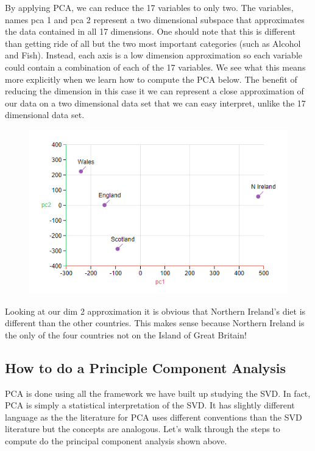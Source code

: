 \documentclass{article}
\begin{document}
\bigskip
By applying PCA, we can reduce the 17 variables to only two. The variables, names pca 1 and pca 2 represent a two dimensional subspace that approximates the data contained in all 17 dimensions. One should note that this is different than getting ride of all but the two most important categories (such as Alcohol and Fish). Instead, each axis is a low dimension approximation so each variable could contain a combination of each of the 17 variables. We see what this means more explicitly when we learn how to compute the PCA below. The benefit of reducing the dimension in this case it we can represent a close approximation of our data on a two dimensional data set that we can easy interpret, unlike the 17 dimensional data set.
\newpage
\begin{figure}[!htp]
    \centering
    \includegraphics[width=12cm]{(18).png}
\end{figure}

Looking at our dim 2 approximation it is obvious that Northern Ireland's diet is different than the other countries. This makes sense because Northern Ireland is the only of the four countries not on the Island of Great Britain!

\subsection{How to do a Principle Component Analysis}
PCA is done using all the framework we have built up studying the SVD. In fact, PCA is simply a statistical interpretation of the SVD. It has slightly different language as the the literature for PCA uses different conventions than the SVD literature but the concepts are analogous. Let's walk through the steps to compute do the principal component analysis shown above.
\bigskip
\end{document}
